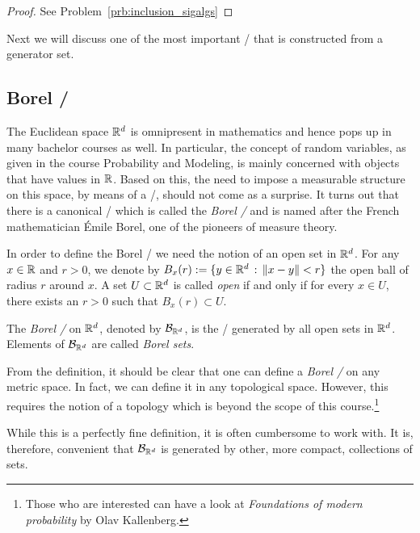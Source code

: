 \begin{proof}
See Problem~\ref{prb:inclusion_sigalgs}
\end{proof}

Next we will discuss one of the most important \sigalgs/ that is constructed from a generator set.

\subsection{Borel \sigalg/}

The Euclidean space $\mathbb R^d$ is omnipresent in mathematics and hence pops up in many bachelor courses as well. In particular, the concept of random variables, as given in the course Probability and Modeling, is mainly concerned with objects that have values in $\mathbb R$. Based on this, the need to impose a measurable structure on this space, by means of a \sigalg/, should not come as a surprise. It turns out that there is a canonical \sigalg/ which is called the \emph{Borel \sigalg/} and is named after the French mathematician \'{E}mile Borel, one of the pioneers of measure theory.

In order to define the Borel \sigalg/ we need the notion of an open set in $\mathbb R^d$. For any $x \in \mathbb R$ and $r >0$, we denote by $B_x(r) := \{y \in \mathbb R^d \, : \, \|x-y\|<r\}$ the open ball of radius $r$ around $x$. A set $U \subset \mathbb R^d$ is called \emph{open} if and only if for every $x \in U$, there exists an $r > 0$ such that $B_x(r) \subset U$.

\begin{definition}
The \emph{Borel \sigalg/} on $\mathbb R^d$, denoted by $\mathcal B_{\mathbb R^d}$, is the \sigalg/ generated by all open sets in $\mathbb R^d$. Elements of $\mathcal B_{\mathbb R^d}$ are called \emph{Borel sets}.
\end{definition}

\begin{remark}
From the definition, it should be clear that one can define a \emph{Borel \sigalg/} on any metric space. In fact, we can define it in any topological space. However, this requires the notion of a topology which is beyond the scope of this course.\footnote{Those who are interested can have a look at \emph{Foundations of modern probability} by Olav Kallenberg.}
\end{remark}

While this is a perfectly fine definition, it is often cumbersome to work with. It is, therefore, convenient that $\mathcal B_{\mathbb R^d}$ is generated by other, more compact, collections of sets.

